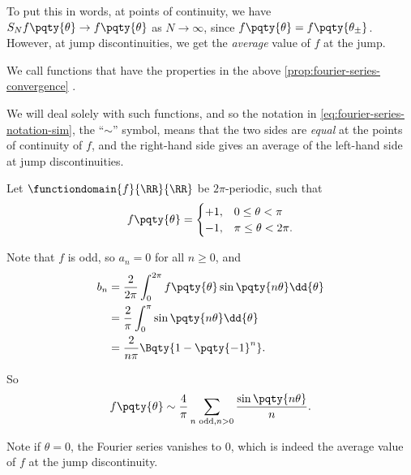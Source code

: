 To put this in words, at points of continuity, we have \(S_N f\pqty{\theta} \to f\pqty{\theta}\) as \(N \to \infty\), since \(f\pqty{\theta} = f\pqty{\theta_{\pm}}\). However, at jump discontinuities, we get the \emph{average} value of \(f\) at the jump.

\begin{definition}
    We call functions that have the properties in the above \autoref{prop:fourier-series-convergence} .
\end{definition}

We will deal solely with such functions, and so the notation in \eqref{eq:fourier-series-notation-sim}, the ``\(\sim\)'' symbol, means that the two sides are \emph{equal} at the points of continuity of \(f\), and the right-hand side gives an average of the left-hand side at jump discontinuities.

\begin{example}
    Let \(\functiondomain{f}{\RR}{\RR}\) be \(2\pi\)-periodic, such that
    \begin{equation}
        f\pqty{\theta} = \begin{cases}
            +1, & 0 \leq \theta < \pi \\
            -1, & \pi \leq \theta < 2 \pi.
        \end{cases}
    \end{equation}

    Note that \(f\) is odd, so \(a_n = 0\) for all \(n \geq 0\), and
    \begin{subequations}
        \begin{align}
            b_n &= \frac{2}{2\pi} \int_{0}^{2\pi} f\pqty{\theta} \sin\pqty{n \theta} \dd{\theta} \\
            &= \frac{2}{\pi} \int_{0}^{\pi} \sin\pqty{n \theta} \dd{\theta} \\
            &= \frac{2}{n \pi} \Bqty{1 - \pqty{-1}^n}.
        \end{align}
    \end{subequations}

    So
    \begin{equation}
        f\pqty{\theta} \sim \frac{4}{\pi} \sum_{n \text{ odd}, n > 0} \frac{\sin \pqty{n \theta}}{n}.
    \end{equation}

    Note if \(\theta = 0\), the Fourier series vanishes to \(0\), which is indeed the average value of \(f\) at the jump discontinuity.
\end{example}

